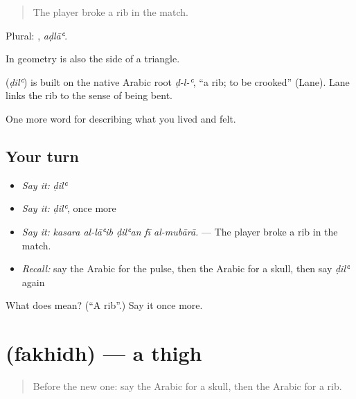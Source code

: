 \begin{quote}
The player broke a rib in the match.
\end{quote}

Plural: , \emph{aḍlāʿ}.

In geometry  is also the side of a triangle.

\begin{cousinweb}
\textbf{} (\emph{ḍilʿ}) is built on the native Arabic root \emph{ḍ-l-ʿ}, \textquotedblleft{}a rib; to be crooked\textquotedblright{} (Lane). Lane links the rib to the sense of being bent.
\end{cousinweb}

\begin{grammarlens}[title={What you've built}]
One more word for describing what you lived and felt.
\end{grammarlens}

\subsection*{Your turn}
\begin{itemize}
\raggedright
  \item \emph{Say it:} \emph{ḍilʿ}
  \item \emph{Say it:} \emph{ḍilʿ}, once more
  \item \emph{Say it:} \emph{kasara al-lāʿib ḍilʿan fī al-mubārā.} — The player broke a rib in the match.
  \item \emph{Recall:} say the Arabic for the pulse, then the Arabic for a skull, then say \emph{ḍilʿ} again
\end{itemize}

\begin{tcolorbox}[breakable,colback=teal!4,colframe=teal!35!black,title={Before you move on}]
What does  mean? (\textquotedblleft{}A rib\textquotedblright{}.) Say it once more.
\end{tcolorbox}
\section[\texorpdfstring{\ar{فخذ} (fakhidh)}{فخذ (fakhidh)}]{ (fakhidh) — a thigh}

\label{lesson:AR-C505-fakhidh}



\begin{quote}
Before the new one: say the Arabic for a skull, then the Arabic for a rib.
\end{quote}

